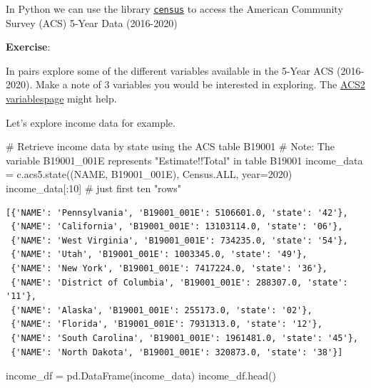 \documentclass[
  letterpaper,
  DIV=11,
  numbers=noendperiod]{scrreprt}
\newenvironment{Shaded}{\begin{snugshade}}{\end{snugshade}}
\newcommand{\CommentTok}[1]{\textcolor[rgb]{0.37,0.37,0.37}{#1}}
\newcommand{\DecValTok}[1]{\textcolor[rgb]{0.68,0.00,0.00}{#1}}
\newcommand{\NormalTok}[1]{\textcolor[rgb]{0.00,0.23,0.31}{#1}}
\newcommand{\OperatorTok}[1]{\textcolor[rgb]{0.37,0.37,0.37}{#1}}
\newcommand{\StringTok}[1]{\textcolor[rgb]{0.13,0.47,0.30}{#1}}
\begin{document}
In Python we can use the library
\href{https://github.com/datamade/census}{\texttt{census}} to access the
American Community Survey (ACS) 5-Year Data (2016-2020)

\textbf{Exercise}:

In pairs explore some of the different variables available in the 5-Year
ACS (2016-2020). Make a note of 3 variables you would be interested in
exploring. The
\href{https://api.census.gov/data/2020/acs/acs5/variables.html}{ACS2
variablespage} might help.

Let's explore income data for example.

\begin{Shaded}
\begin{Highlighting}[]
\CommentTok{\# Retrieve income data by state using the ACS table B19001}
\CommentTok{\# Note: The variable \textquotesingle{}B19001\_001E\textquotesingle{} represents "Estimate!!Total" in table B19001}
\NormalTok{income\_data }\OperatorTok{=}\NormalTok{ c.acs5.state((}\StringTok{\textquotesingle{}NAME\textquotesingle{}}\NormalTok{, }\StringTok{\textquotesingle{}B19001\_001E\textquotesingle{}}\NormalTok{), Census.ALL, year}\OperatorTok{=}\DecValTok{2020}\NormalTok{)}
\NormalTok{income\_data[:}\DecValTok{10}\NormalTok{] }\CommentTok{\# just first ten "rows"}
\end{Highlighting}
\end{Shaded}

\begin{verbatim}
[{'NAME': 'Pennsylvania', 'B19001_001E': 5106601.0, 'state': '42'},
 {'NAME': 'California', 'B19001_001E': 13103114.0, 'state': '06'},
 {'NAME': 'West Virginia', 'B19001_001E': 734235.0, 'state': '54'},
 {'NAME': 'Utah', 'B19001_001E': 1003345.0, 'state': '49'},
 {'NAME': 'New York', 'B19001_001E': 7417224.0, 'state': '36'},
 {'NAME': 'District of Columbia', 'B19001_001E': 288307.0, 'state': '11'},
 {'NAME': 'Alaska', 'B19001_001E': 255173.0, 'state': '02'},
 {'NAME': 'Florida', 'B19001_001E': 7931313.0, 'state': '12'},
 {'NAME': 'South Carolina', 'B19001_001E': 1961481.0, 'state': '45'},
 {'NAME': 'North Dakota', 'B19001_001E': 320873.0, 'state': '38'}]
\end{verbatim}

\begin{Shaded}
\begin{Highlighting}[]
\NormalTok{income\_df }\OperatorTok{=}\NormalTok{ pd.DataFrame(income\_data)}
\NormalTok{income\_df.head()}
\end{Highlighting}
\end{Shaded}
\end{document}
